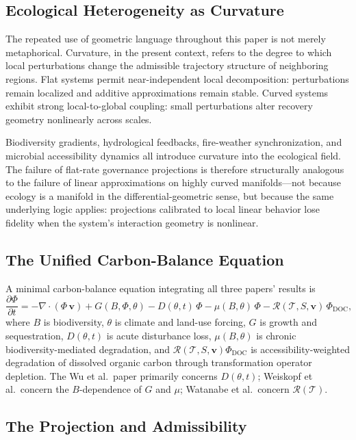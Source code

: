 \documentclass[12pt]{article}
\newcommand{\Tcal}{\mathcal{T}}
\begin{document}
\subsection{Ecological Heterogeneity as Curvature}

The repeated use of geometric language throughout this paper is not merely metaphorical.
Curvature, in the present context, refers to the degree to which local perturbations
change the admissible trajectory structure of neighboring regions. Flat systems permit
near-independent local decomposition: perturbations remain localized and additive
approximations remain stable. Curved systems exhibit strong local-to-global coupling:
small perturbations alter recovery geometry nonlinearly across scales.

Biodiversity gradients, hydrological feedbacks, fire-weather synchronization, and
microbial accessibility dynamics all introduce curvature into the ecological field.
The failure of flat-rate governance projections is therefore structurally analogous to
the failure of linear approximations on highly curved manifolds---not because ecology
is a manifold in the differential-geometric sense, but because the same underlying
logic applies: projections calibrated to local linear behavior lose fidelity when
the system's interaction geometry is nonlinear.

\subsection{The Unified Carbon-Balance Equation}

A minimal carbon-balance equation integrating all three papers' results is
\begin{equation}
\label{eq:carbon-balance}
\frac{\partial\Phi}{\partial t}
= -\nabla\cdot(\Phi\,\mathbf{v})
+ G(B,\Phi,\theta)
- D(\theta,t)\,\Phi
- \mu(B,\theta)\,\Phi
- \mathcal{R}(\Tcal,S,\mathbf{v})\,\Phi_\text{DOC},
\end{equation}
where $B$ is biodiversity, $\theta$ is climate and land-use forcing, $G$ is growth and
sequestration, $D(\theta,t)$ is acute disturbance loss, $\mu(B,\theta)$ is chronic
biodiversity-mediated degradation, and $\mathcal{R}(\Tcal,S,\mathbf{v})\Phi_\text{DOC}$
is accessibility-weighted degradation of dissolved organic carbon through transformation
operator depletion. The Wu et al.\ paper primarily concerns $D(\theta,t)$; Weiskopf et al.\
concern the $B$-dependence of $G$ and $\mu$; Watanabe et al.\ concern $\mathcal{R}(\Tcal)$.

\subsection{The Projection and Admissibility}
\end{document}
